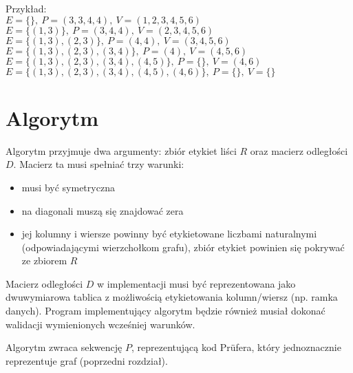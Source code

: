 \documentclass[a4paper,12p]{article}
\begin{document}
Przykład: \\
$E=\{\},~P=(3,3,4,4),~V=(1,2,3,4,5,6)$ \\
$E=\{(1,3)\},~P=(3,4,4),~V=(2,3,4,5,6)$ \\
$E=\{(1,3), (2,3)\},~P=(4,4),~V=(3,4,5,6)$ \\
$E=\{(1,3), (2,3), (3,4)\},~P=(4),~V=(4,5,6)$ \\
$E=\{(1,3), (2,3), (3,4), (4,5)\},~P=\{\},~V=(4,6)$ \\
$E=\{(1,3), (2,3), (3,4), (4,5), (4,6)\},~P=\{\},~V=\{\}$ \\


\newpage

\section{Algorytm}

Algorytm przyjmuje dwa argumenty: zbiór etykiet liści $R$ oraz macierz odległości $D$. Macierz ta musi spełniać trzy warunki:

\begin{itemize}
	\item musi być symetryczna
	\item na diagonali muszą się znajdować zera
	\item jej kolumny i wiersze powinny być etykietowane liczbami naturalnymi (odpowiadającymi wierzchołkom grafu), zbiór etykiet powinien się pokrywać ze zbiorem $R$ 
\end{itemize}

Macierz odległości $D$ w implementacji musi być reprezentowana jako dwuwymiarowa tablica z możliwością etykietowania kolumn/wiersz (np. ramka danych). Program implementujący algorytm będzie również musiał dokonać walidacji wymienionych wcześniej warunków.

Algorytm zwraca sekwencję $P$, reprezentującą kod Prüfera, który jednoznacznie reprezentuje graf (poprzedni rozdział).
\end{document}
